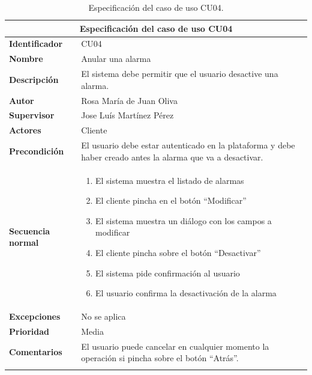 \documentclass[pdftex,11pt,a4paper]{book}
\begin{document}

\renewcommand{\tablename}{Tabla}
\renewcommand{\arraystretch}{1,7}

\begin{center}
\begin{longtable}{|m{}|m{11cm}|}
\hline
\multicolumn{2}{|c|}{\textbf{Especificación del caso de uso CU04}}\\
\hline 
\endhead

\textbf{Identificador} & CU04  
\\ \hline
\textbf{Nombre} & Anular una alarma  
\\ \hline
\textbf{Descripción} & El sistema debe permitir que el usuario desactive una alarma.
\\ \hline
\textbf{Autor} & Rosa María de Juan Oliva 
\\ \hline
\textbf{Supervisor} & Jose Luís Martínez Pérez  
\\ \hline
\textbf{Actores} & Cliente 
\\ \hline
\textbf{Precondición} & El usuario debe estar autenticado en la plataforma y debe haber creado antes la alarma que va a desactivar. 
\\ \hline
\textbf{Secuencia normal} & 
\begin{enumerate}
\addtolength{\itemsep}{-3mm}
\item El sistema muestra el listado de alarmas
\item El cliente pincha en el botón “Modificar”
\item El sistema muestra un diálogo con los campos a modificar
\item El cliente pincha sobre el botón “Desactivar”
\item El sistema pide confirmación al usuario
\item El usuario confirma la desactivación de la alarma
\end{enumerate}
\\ \hline
\textbf{Excepciones} & No se aplica
\\ \hline
\textbf{Prioridad} & Media 
\\ \hline
\textbf{Comentarios} & El usuario puede cancelar en cualquier momento la operación si pincha sobre el botón “Atrás”.   
\\ \hline

\caption{Especificación del caso de uso CU04.} \label{tablalarga:tablaCU04}
\end{longtable}
\end{center}
\end{document}

